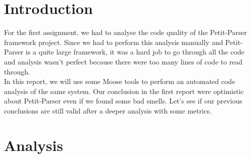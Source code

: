 

\usepackage{todonotes}


\section{Introduction}
For the first assignment, we had to analyse the code quality of the Petit-Parser framework project. Since we had to perform this analysis manually and Petit-Parser is a quite large framework, it was a hard job to go through all the code and analysis wasn't perfect because there were too many lines of code to read through. \\
In this report, we will use some Moose tools to perform an automated code analysis of the same system. Our conclusion in the first report were optimistic about Petit-Parser even if we found some bad smells. Let's see if our previous conclusions are still valid after a deeper analysis with some metrics.
\section{Analysis}
